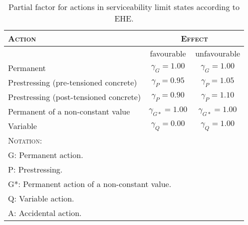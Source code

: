 \begin{table}
\begin{center}
\begin{footnotesize}
\begin{tabular}{|l|c|c|}
\hline
\textsc{Action} & \multicolumn{2}{|c|}{\textsc{Effect}} \\
\hline
 & favourable & unfavourable \\
\hline
Permanent  & $\gamma_G= 1.00$ &  $\gamma_G= 1.00$ \\
\hline
Prestressing (pre-tensioned concrete) & $\gamma_{P}= 0.95$ &  $\gamma_{P}= 1.05$ \\
Prestressing (post-tensioned concrete) & $\gamma_{P}= 0.90$ &  $\gamma_{P}= 1.10$ \\ 
\hline
Permanent of a non-constant value & $\gamma_{G*}= 1.00$ &  $\gamma_{G*}= 1.00$ \\
\hline
Variable & $\gamma_Q= 0.00$ &  $\gamma_Q= 1.00$ \\
\hline
\multicolumn{3}{|l|}{\textsc{Notation:}} \\
\hline
\multicolumn{3}{|l|}{G: Permanent action.} \\
\multicolumn{3}{|l|}{P: Prestressing.} \\
\multicolumn{3}{|l|}{G*: Permanent action of a non-constant value.} \\
\multicolumn{3}{|l|}{Q: Variable action.} \\
\multicolumn{3}{|l|}{A: Accidental action.} \\
\hline
\end{tabular}
\end{footnotesize}
\caption{Partial factor for actions in serviceability limit states according to EHE.} \label{tb_gf_ELS_EHE}
\end{center}
\end{table}

